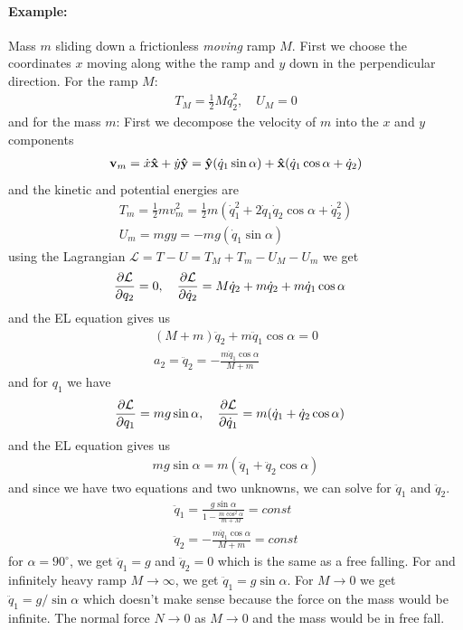 \documentclass[../main.tex]{subfiles}
\begin{document}
\paragraph*{Example:}  Mass $m$ sliding down a frictionless \emph{moving} ramp $M$. First we choose the
coordinates $x$ moving along withe the ramp and $y$ down in the perpendicular direction. For the
ramp $M$:
\begin{align*}
    T_M = \frac{1}{2} M \dot q_2^2, \quad U_M = 0
\end{align*}
and for the mass $m$: First we decompose the velocity of $m$ into the $x$ and $y$ components
\begin{align*}
    \vb v_m = \dot x \vu x + \dot y \vu y = \vu y(\dot q_1 \sin \alpha)
        + \vu x(\dot q_1 \cos \alpha + \dot q_2)
\end{align*}
and the kinetic and potential energies are
\begin{align*}
    T_m = \frac{1}{2} m v_m^2 = \frac{1}{2} m (\dot q_1^2 + 2 \dot q_1 \dot q_2 \cos \alpha + \dot q_2^2) \\
    U_m = mgy = -mg (\dot q_1 \sin \alpha)
\end{align*}
using the Lagrangian $\mathcal{L} = T - U = T_M + T_m - U_M - U_m$ we get
\begin{align*}
    \pdv{\mathcal{L}}{q_2} &= 0, \quad \pdv{\mathcal{L}}{\dot q_2} = M \dot q_2 + m \dot q_2 + m \dot q_1 \cos \alpha
\end{align*}
and the EL equation gives us
\begin{align*}
    (M + m) \ddot q_2 + m \ddot q_1 \cos \alpha = 0 \\
    a_2 = \ddot q_2 = -\frac{m \ddot q_1 \cos \alpha}{M + m}
\end{align*}
and for $q_1$ we have
\begin{align*}
    \pdv{\mathcal{L}}{q_1} &= mg \sin \alpha,
        \quad \pdv{\mathcal{L}}{\dot q_1} = m (\dot q_1 + \dot q_2 \cos \alpha)
\end{align*}
and the EL equation gives us
\begin{align*}
    mg \sin \alpha = m (\ddot q_1 + \ddot q_2 \cos \alpha)
\end{align*}
and since we have two equations and two unknowns, we can solve for $\ddot q_1$ and $\ddot q_2$.
\begin{align*}
    \ddot q_1 = \frac{g \sin \alpha}{1 - \frac{m\cos^2 \alpha}{m + M}} = const \\
    \ddot q_2 = -\frac{m \ddot q_1 \cos \alpha}{M + m} = const
\end{align*}
for $\alpha = 90^\circ$, we get $\ddot q_1 = g$ and $\ddot q_2 = 0$ which is the same as a free falling.
For and infinitely heavy ramp $M \to \infty$, we get $\ddot q_1 = g \sin\alpha$. For $M \to 0$ we
get $\ddot q_1 = g / \sin\alpha$ which doesn't make sense because the force on the mass would be
infinite. The normal force $N \to 0$ as $M \to 0$ and the mass would be in free fall.
\end{document}
